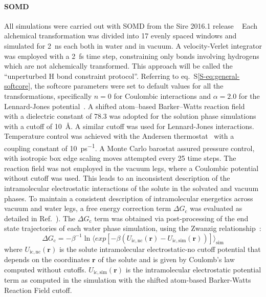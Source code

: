 \documentclass[journal=jctcce,manuscript=article]{achemso}
\begin{document}
\paragraph{SOMD} All simulations were carried out with
SOMD from the Sire 2016.1 release ~\cite{Sire-2016, doi:10.1021/ct300857j}
Each alchemical transformation was
divided into 17 evenly spaced windows and simulated for \SI{2}{ns}
each both in water and in vacuum. A velocity-Verlet integrator was
employed with a \SI{2}{fs} time step, constraining only bonds involving hydrogens which are not alchemically transformed.  This approach will be called the ``unperturbed H bond constraint protocol''. Referring to eq.~S\ref{S-eq:general-softcore}, the softcore parameters were set to default values for all the transformations, specifically $n = 0$ for Coulombic interactions and $\alpha = 2.0$ for the Lennard-Jones potential~\cite{doi:10.1021/ct700081t}.  A shifted atom--based Barker--Watts reaction field~\cite{doi:10.1080/00268977300102101} with
a dielectric constant of \num{78.3} was adopted for the solution phase
simulations with a cutoff of \SI{10}{\angstrom}. A similar cutoff was used for 
Lennard-Jones interactions. Temperature control was achieved with the Andersen
thermostat~\cite{doi:10.1063/1.439486} with a coupling constant of
\SI{10}{ps^{-1}}.  A Monte Carlo barostat assured pressure control,
with isotropic box edge scaling moves attempted every 25 time steps.
The reaction field was not employed in the vacuum legs, where a Coulombic 
potential without cutoff was used.  This leads to an inconsistent description of the intramolecular electrostatic interactions of the solute in the solvated and vacuum phases.   To maintain a consistent description of intramolecular 
energetics across vacuum and water legs, a free energy correction term $\Delta G_{\mathrm{c}}$ was  evaluated as detailed in Ref.~).  The
$\Delta G_{\mathrm{c}}$ term was obtained via post-processing of the end state 
trajectories of each water phase simulation, using the Zwanzig 
relationship~\cite{zwanzig_high-temperature_1954}:
\begin{equation}
 \label{eq:ZwanzigDGfunc}
 \Delta G_{\mathrm{c}} = -\beta^{-1} \ln \langle exp 
 \left[-\beta(U_{\mathrm{ic,nc}}(\mathbf{r}) - 
 U_{\mathrm{ic,sim}}(\mathbf{r}))\right]\rangle_{\mathrm{sim}}
\end{equation}
where $U_{\mathrm{ic,nc}}(\mathbf{r})$ is the solute intramolecular 
electrostatic-no cutoff 
potential that depends on the coordinates $\mathbf{r}$ of the solute and is 
given by Coulomb's law computed without cutoffs. 
$U_{\mathrm{ic,sim}}(\mathbf{r})$ is the intramolecular electrostatic potential 
term as
computed in the simulation with the shifted atom-based Barker-Watts Reaction 
Field cutoff.
\end{document}
